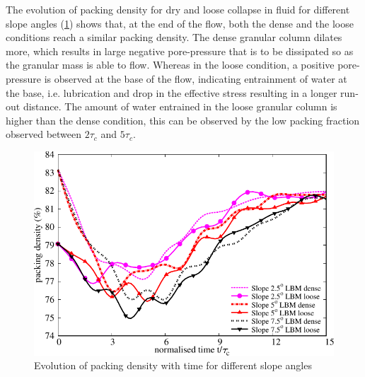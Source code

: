 The evolution of packing density for dry and loose collapse in fluid for 
different slope angles (\cref{fig:voro}) shows that, at the end 
of the flow, both the dense and the loose conditions reach a similar packing 
density. The dense granular column dilates more, which results in large 
negative pore-pressure that is to be dissipated so as the granular mass is able 
to flow. Whereas in the loose condition, a positive pore-pressure is observed 
at the base of the flow, indicating entrainment of 
water at the base, i.e. lubrication and drop in the effective stress resulting 
in a longer run-out distance. The amount of water entrained in the loose 
granular 
column is higher than the dense condition, this can be observed by the low 
packing fraction observed between $2\tau_c$ and $5 \tau_c$. 

\begin{figure}
\centering
\includegraphics[width=0.97\columnwidth]{Voronoi_Slope_Dense_Loose}
\caption{Evolution of packing density with time for different slope angles}
\label{fig:voro}
\end{figure}

